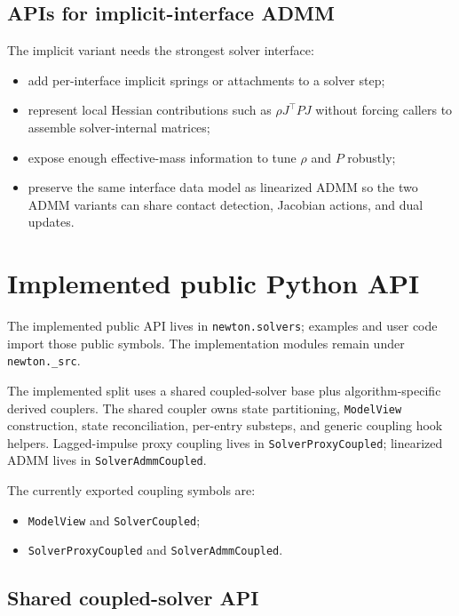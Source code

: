 \documentclass[11pt]{article}
\begin{document}
\subsection{APIs for implicit-interface ADMM}

The implicit variant needs the strongest solver interface:
\begin{itemize}
\item add per-interface implicit springs or attachments to a solver step;
\item represent local Hessian contributions such as $\rho J^\top P J$ without forcing
      callers to assemble solver-internal matrices;
\item expose enough effective-mass information to tune $\rho$ and $P$ robustly;
\item preserve the same interface data model as linearized ADMM so the two ADMM
      variants can share contact detection, Jacobian actions, and dual updates.
\end{itemize}

\section{Implemented public Python API}

The implemented public API lives in \texttt{newton.solvers}; examples and user code
import those public symbols. The implementation modules remain under
\texttt{newton.\_src}.

The implemented split uses a shared coupled-solver base plus algorithm-specific
derived couplers. The shared coupler owns state partitioning, \texttt{ModelView}
construction, state reconciliation, per-entry substeps, and generic coupling hook
helpers. Lagged-impulse proxy coupling lives in \texttt{SolverProxyCoupled};
linearized ADMM lives in \texttt{SolverAdmmCoupled}.

The currently exported coupling symbols are:
\begin{itemize}
\item \texttt{ModelView} and \texttt{SolverCoupled};
\item \texttt{SolverProxyCoupled} and \texttt{SolverAdmmCoupled}.
\end{itemize}

\subsection{Shared coupled-solver API}
\end{document}
